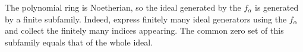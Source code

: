 The polynomial ring is Noetherian, so the ideal generated by the $f_\alpha$ is generated by a finite subfamily. Indeed, express finitely many ideal generators using the $f_\alpha$ and collect the finitely many indices appearing. The common zero set of this subfamily equals that of the whole ideal.
